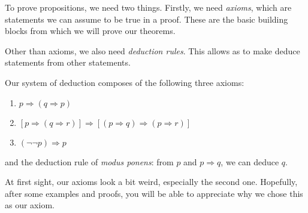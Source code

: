 \documentclass[a4paper]{article}
\begin{document}
To prove propositions, we need two things. Firstly, we need \emph{axioms}, which are statements we can assume to be true in a proof. These are the basic building blocks from which we will prove our theorems.

Other than axioms, we also need \emph{deduction rules}. This allows as to make deduce statements from other statements.

Our system of deduction composes of the following three axioms:
\begin{enumerate}[label=\arabic{*}.]
  \item $p\Rightarrow(q\Rightarrow p)$
  \item $[p\Rightarrow(q\Rightarrow r)]\Rightarrow[(p\Rightarrow q)\Rightarrow(p \Rightarrow r)]$
  \item $(\neg\neg p)\Rightarrow p$
\end{enumerate}
and the deduction rule of \emph{modus ponens}: from $p$ and $p\Rightarrow q$, we can deduce $q$.

At first sight, our axioms look a bit weird, especially the second one. Hopefully, after some examples and proofs, you will be able to appreciate why we chose this as our axiom.
\end{document}
